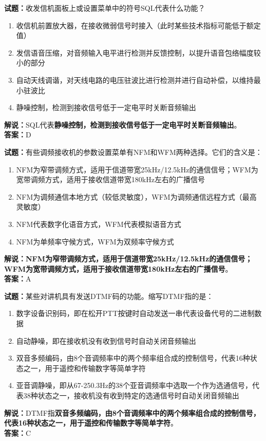 \documentclass{ctexbook}
\begin{document}
\bigskip


\noindent\textbf{试题：}收发信机面板上或设置菜单中的符号SQL代表什么功能？
\begin{enumerate}[leftmargin=3em]
\item 收信机前置放大器，在接收微弱信号时接入（此时某些技术指标可能低于额定值）
\item 发信语音压缩，对音频输入电平进行检测并反馈控制，以提升语音包络幅度较小的部分
\item 自动天线调谐，对天线电路的电压驻波比进行检测并进行自动补偿，以维持最小驻波比
\item 静噪控制，检测到接收信号低于一定电平时关断音频输出
\end{enumerate}
\noindent\textbf{解说：}SQL代表\textbf{静噪控制，检测到接收信号低于一定电平时关断音频输出}。\\\noindent\textbf{答案：}D



\bigskip


\noindent\textbf{试题：}有些调频接收机的参数设置菜单有NFM和WFM两种选择。它们的含义是：
\begin{enumerate}[leftmargin=3em]
\item NFM为窄带调频方式，适用于信道带宽25kHz/12.5kHz的通信信号；WFM为宽带调频方式，适用于接收信道带宽180kHz左右的广播信号
\item NFM为调频通信本地方式（较低灵敏度），WFM为调频通信远程方式（最高灵敏度）
\item NFM代表数字化语音方式，WFM代表模拟语音方式
\item NFM为单频率守候方式，WFM为双频率守候方式
\end{enumerate}
\noindent\textbf{解说：NFM为窄带调频方式，适用于信道带宽25kHz/12.5kHz的通信信号；WFM为宽带调频方式，适用于接收信道带宽180kHz左右的广播信号}。\\\noindent\textbf{答案：}A



\bigskip


\noindent\textbf{试题：}某些对讲机具有发送DTMF码的功能。缩写DTMF指的是：
\begin{enumerate}[leftmargin=3em]
\item 数字设备识别码，即在松开PTT按键时自动发送一串代表设备代号的二进制数据
\item 自动静噪，即在接收机没有收到信号时自动关闭音频输出
\item 双音多频编码，由8个音调频率中的两个频率组合成的控制信号，代表16种状态之一，用于遥控和传输数字等简单字符
\item 亚音调静噪，即从67-250.3Hz的38个亚音调频率中选取一个作为选通信号，代表38种状态之一，接收机没有收到特定的选通信号时自动关闭音频输出
\end{enumerate}
\noindent\textbf{解说：}DTMF指\textbf{双音多频编码，由8个音调频率中的两个频率组合成的控制信号，代表16种状态之一，用于遥控和传输数字等简单字符}。\\\noindent\textbf{答案：}C
\end{document}

